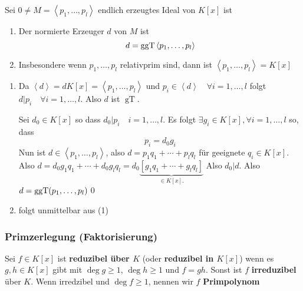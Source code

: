 \begin{subcorollary}
	Sei $ 0 \neq M = \left<p_1, \dotsc, p_l \right> $ endlich erzeugtes Ideal von $ K[x] $ ist
	\begin{enumerate}[label=(\arabic*)]
		\item Der normierte Erzeuger $ d $ von $ M $ ist
			\[
				d = \operatorname{ggT} \left< p_1, \dotsc, p_l \right>
			\]
		\item Insbesondere wenn $ p_1, \dotsc, p_l $ relativprim sind, dann ist $ \left< p_1, \dotsc, p_l \right> = K[x] $
	\end{enumerate}
\end{subcorollary}
\begin{subproof*}
	\begin{enumerate}[label=(\arabic*)]
		\item Da $ \left< d \right> = d K[x] = \left< p_1, \dotsc, p_l \right> $ und $ p_i \in \left< d \right> \quad \forall i = 1, \dotsc, l $ folgt $ d | p_i \quad \forall i = 1, \dotsc, l $. Also $ d $ ist $ \operatorname{gT} $.

			Sei $ d_0 \in K[x] $ so dass $ d_0 | p_i \quad i = 1, \dotsc, l $.
			Es folgt $ \exists g_i \in K[x], \forall i = 1, \dotsc, l $ so, dass
			\[
				p_i = d_0 g_i
			\]
			Nun ist $ d \in \left< p_1, \dotsc, p_l \right> $, also $ d = p_1 q_1 + \dotsb + p_lq_l $ für geeignete $ q_i \in K[x] $.
			Also $ d = d_0g_1q_1 + \dotsb + d_0 g_l q_l = d_0 \underbrace{\left[ g_1q_1 + \dotsb + g_l q_l \right]}_{\in K[x].} $ 
			Also $ d_0 | d $.
			Also $ d = \operatorname{ggT} (p_1, \dotsc, p_l) $\qed
		\item folgt unmittelbar aus (1)
	\end{enumerate}
\end{subproof*}



\setcounter{subsubsection}{4}
\subsubsection{Primzerlegung (Faktorisierung)}

\begin{subdefinition}
	Sei $ f \in K[x] $ ist \textbf{reduzibel über $ K $} (oder \textbf{reduzibel in $ K[x] $}) wenn es $ g, h \in K[x] $ gibt mit $ \deg g \geq  1 $, $ \deg h \geq 1 $ und $ f = gh $.
	Sonst ist $ f $ \textbf{irreduzibel} über $ K $. 
	Wenn irredzibel und $ \deg f \geq 1 $, nennen wir $ f $ \textbf{Primpolynom}
\end{subdefinition}

